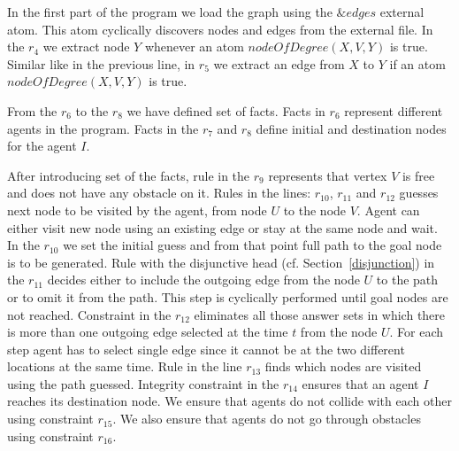 \documentclass[a4paper, titlepage]{article}
\begin{document}
In the first part of the program we load the graph using 
the $\&edges$ external atom. This atom cyclically discovers 
nodes and edges from the external file. In the $r_4$ we 
extract node $Y$ whenever an atom $\mathit{nodeOfDegree(X, 
V, Y)}$ is true. Similar like in the previous line, in 
$r_5$ we extract an edge from $X$ to $Y$ if an atom 
$\mathit{nodeOfDegree(X, V,Y)}$ is true. 

From the $r_6$ to the $r_8$ we have defined set of facts. 
Facts in $r_6$ represent different agents in the program. 
Facts in the $r_{7}$ and $r_{8}$ define initial and 
destination nodes for the agent $I$.  

After introducing set of the facts, rule in the $r_{9}$ 
represents that vertex $V$ is free and does not have any 
obstacle on it. Rules in the lines: $r_{10}$, $r_{11}$ and 
$r_{12}$ guesses next node to be visited by the agent, from 
node $U$ to the node $V$. Agent can either visit new node 
using an existing edge or stay at the same node and wait. 
In the $r_{10}$ we set the initial guess and from that 
point full path to the goal node is to be generated. Rule 
with the disjunctive head (cf. Section~\ref{disjunction}) 
in the $r_{11}$ decides either to include the outgoing edge 
from the node $U$ to the path or to omit it from the path. 
This step is cyclically performed until goal nodes are not 
reached. Constraint in the $r_{12}$ eliminates all those 
answer sets in which there is more than one outgoing edge 
selected at the time $t$ from the node $U$. For each step 
agent has to select single edge since it cannot be at the 
two different locations at the same time. Rule in the line 
$r_{13}$ finds which nodes are visited using the path 
guessed. Integrity constraint in the $r_{14}$ ensures that 
an agent $I$ reaches its destination node. We ensure that 
agents do not collide with each other using constraint 
$r_{15}$. We also ensure that agents do not go through 
obstacles using constraint $r_{16}$. 
\end{document}
